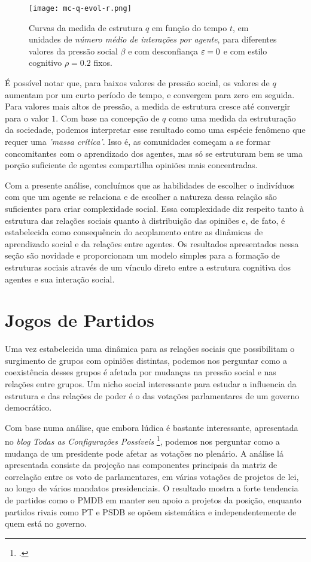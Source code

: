 \begin{figure}[b!]\label{fig:mc-q-evol-r}
    \centering
    \texttt{[image: mc-q-evol-r.png]}
    \caption{Curvas da medida de estrutura $q$ em função do tempo $t$, em unidades de \emph{número médio de interações por agente}, para diferentes valores da pressão social $\beta$ e com desconfiança $\varepsilon=0$ e com estilo cognitivo $\rho=0.2$ fixos.}
\end{figure}

É possível notar que, para baixos valores de pressão social, os valores de $q$ aumentam por um curto período de tempo, e convergem para zero em seguida.
Para valores mais altos de pressão, a medida de estrutura cresce até convergir para o valor $1$.
Com base na concepção de $q$ como uma medida da estruturação da sociedade, podemos interpretar esse resultado como uma espécie fenômeno que requer uma \emph{'massa crítica'}.
Isso é, as comunidades começam a se formar concomitantes com o aprendizado dos agentes, mas só se estruturam bem se uma porção suficiente de agentes compartilha opiniões mais concentradas.

Com a presente análise, concluímos que as habilidades de escolher o indivíduos com que um agente se relaciona e de escolher a natureza dessa relação são suficientes para criar complexidade social.
Essa complexidade diz respeito tanto à estrutura das relações sociais quanto à distribuição das opiniões e, de fato, é estabelecida como consequência do acoplamento entre as dinâmicas de aprendizado social e da relações entre agentes.
Os resultados apresentados nessa seção são novidade e proporcionam um modelo simples para a formação de estruturas sociais através de um vínculo direto entre a estrutura cognitiva dos agentes e sua interação social.

\vfill
\pagebreak
\section{Jogos de Partidos}
\label{sec:DM}

Uma vez estabelecida uma dinâmica para as relações sociais que possibilitam o surgimento de grupos com opiniões distintas, podemos nos perguntar como a coexistência desses grupos é afetada por mudanças na pressão social e nas relações entre grupos.
Um  nicho social interessante para estudar a influencia da estrutura e das relações de poder é o das votações parlamentares de um governo democrático.

Com base numa análise, que embora lúdica é bastante interessante, apresentada no \emph{blog} \emph{Todas as Configurações Possíveis} \footcite{MarinoBlog1, MarinoBlog2}, podemos nos perguntar como a mudança de um presidente pode afetar as votações no plenário.
A análise lá apresentada consiste da projeção nas componentes principais da matriz de correlação entre os voto de parlamentares, em várias votações de projetos de lei, ao longo de vários mandatos presidenciais.
O resultado mostra a forte tendencia de partidos como o PMDB em manter seu apoio a projetos da posição, enquanto partidos rivais como PT e PSDB se opõem sistemática e independentemente de quem está no governo.

